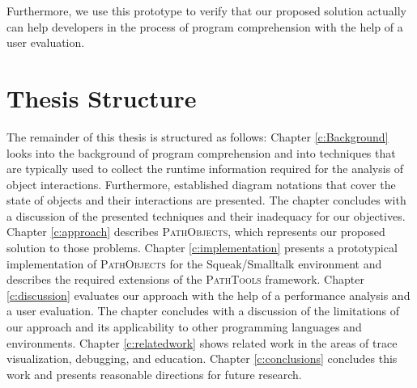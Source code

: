 Furthermore, we use this prototype to verify that our proposed solution actually can help developers in the process of program comprehension with the help of a user evaluation.

\section{Thesis Structure}
The remainder of this thesis is structured as follows:
Chapter \ref{c:Background} looks into the background of program comprehension and into techniques that are typically used to collect the runtime information required for the analysis of object interactions.
Furthermore, established diagram notations that cover the state of objects and their interactions are presented.
The chapter concludes with a discussion of the presented techniques and their inadequacy for our objectives.
Chapter \ref{c:approach} describes \textsc{PathObjects}, which represents our proposed solution to those problems.
Chapter \ref{c:implementation} presents a prototypical implementation of \textsc{PathObjects} for the Squeak/Smalltalk environment and describes the required extensions of the \textsc{PathTools} framework.
Chapter \ref{c:discussion} evaluates our approach with the help of a performance analysis and a user evaluation. 
The chapter concludes with a discussion of the limitations of our approach and its applicability to other programming languages and environments.
Chapter \ref{c:relatedwork} shows related work in the areas of trace visualization, debugging, and education.
Chapter \ref{c:conclusions} concludes this work and presents reasonable directions for future research.